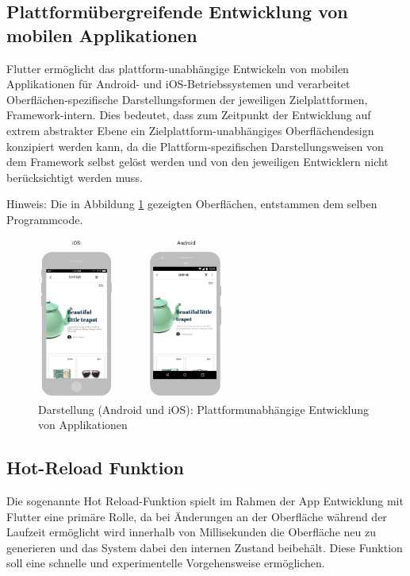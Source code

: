\documentclass[bibliography=totoc,listof=totoc,BCOR=5mm,DIV=12,oneside]{scrbook}
\begin{document}
\subsection{Plattformübergreifende Entwicklung von mobilen Applikationen}
\par Flutter ermöglicht das plattform-unabhängige Entwickeln von mobilen Applikationen für Android- und iOS-Betriebssystemen und verarbeitet Oberflächen-spezifische Darstellungsformen der jeweiligen Zielplattformen, Framework-intern. Dies bedeutet, dass zum Zeitpunkt der Entwicklung auf extrem abstrakter Ebene ein Zielplattform-unabhängiges Oberflächendesign konzipiert werden kann, da die Plattform-spezifischen Darstellungsweisen von dem Framework selbst gelöst werden und von den jeweiligen Entwicklern nicht berücksichtigt werden muss. 
\par \bigskip Hinweis: Die in Abbildung \ref{img:FlutterVisualisierungiOSAndoid} gezeigten Oberflächen, entstammen dem selben Programmcode.

\begin{figure}[H]
	\centering
	\includegraphics[width=0.55\textwidth, keepaspectratio]{Bilder/PlattformUebergreifendDesign.png}
	\caption{Darstellung (Android und iOS): Plattformunabhängige Entwicklung von Applikationen \cite[What is Flutter?]{Flu8}}
	\label{img:FlutterVisualisierungiOSAndoid}
\end{figure}

\newpage
\subsection{Hot-Reload Funktion}
\par Die sogenannte \grqq Hot Reload\grqq -Funktion spielt im Rahmen der App Entwicklung mit Flutter eine primäre Rolle, da bei Änderungen an der Oberfläche während der Laufzeit ermöglicht wird innerhalb von \grqq Millisekunden\grqq{} die Oberfläche neu zu generieren und das System dabei den internen Zustand beibehält. Diese Funktion soll eine schnelle und experimentelle Vorgehensweise ermöglichen.\citep{Flu1}
\end{document}
